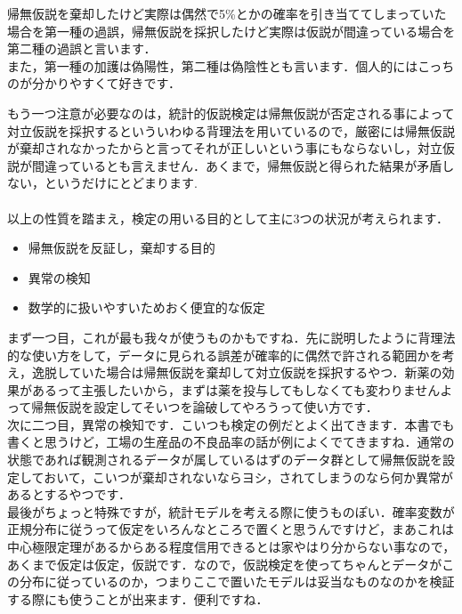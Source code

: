 \documentclass[11pt,a4paper,uplatex]{ujreport} 	%
\begin{document}
帰無仮説を棄却したけど実際は偶然で5\%とかの確率を引き当ててしまっていた場合を第一種の過誤，帰無仮説を採択したけど実際は仮説が間違っている場合を第二種の過誤と言います．\\

また，第一種の加護は偽陽性，第二種は偽陰性とも言います．個人的にはこっちのが分かりやすくて好きです．

もう一つ注意が必要なのは，統計的仮説検定は帰無仮説が否定される事によって対立仮説を採択するといういわゆる背理法を用いているので，厳密には帰無仮説が棄却されなかったからと言ってそれが正しいという事にもならないし，対立仮説が間違っているとも言えません．あくまで，帰無仮説と得られた結果が矛盾しない，というだけにとどまります. \\\\

以上の性質を踏まえ，検定の用いる目的として主に3つの状況が考えられます．\\

\begin{itemize}
  \item 帰無仮説を反証し，棄却する目的
  \item 異常の検知
  \item 数学的に扱いやすいためおく便宜的な仮定
\end{itemize}

まず一つ目，これが最も我々が使うものかもですね．先に説明したように背理法的な使い方をして，データに見られる誤差が確率的に偶然で許される範囲かを考え，逸脱していた場合は帰無仮説を棄却して対立仮説を採択するやつ．新薬の効果があるって主張したいから，まずは薬を投与してもしなくても変わりませんよって帰無仮説を設定してそいつを論破してやろうって使い方です．\\

次に二つ目，異常の検知です．こいつも検定の例だとよく出てきます．本書でも書くと思うけど，工場の生産品の不良品率の話が例によくでてきますね．通常の状態であれば観測されるデータが属しているはずのデータ群として帰無仮説を設定しておいて，こいつが棄却されないならヨシ，されてしまうのなら何か異常があるとするやつです．\\

最後がちょっと特殊ですが，統計モデルを考える際に使うものぽい．確率変数が正規分布に従うって仮定をいろんなところで置くと思うんですけど，まあこれは中心極限定理があるからある程度信用できるとは家やはり分からない事なので，あくまで仮定は仮定，仮説です．なので，仮説検定を使ってちゃんとデータがこの分布に従っているのか，つまりここで置いたモデルは妥当なものなのかを検証する際にも使うことが出来ます．便利ですね．
\end{document}

